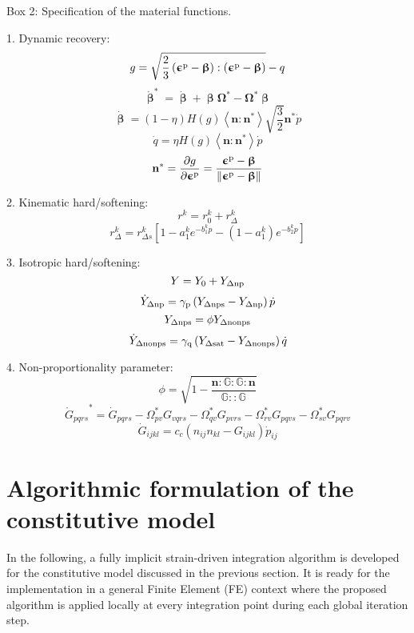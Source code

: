 \begin{framed}
\label{Box:1}
Box 2: Specification of the material functions.

1. Dynamic recovery:
\[g = \sqrt {\frac{2}{3}\left( {{{\bm{\upepsilon }}^{\rm{p}}} - {\bm{\upbeta}}} \right):\left( {{{\bm{\upepsilon }}^{\rm{p}}} - {\bm{\upbeta}}} \right)}  - q\]
\[{\mathring {\bm{\upbeta }}^{*}} = \dot {\bm{\upbeta }}  + \bm{\upbeta } {{\mathbf{\Omega }}^*} - {{\mathbf{\Omega }}^*}\bm{\upbeta }\]
\[\dot{\bm{\upbeta}}  = \left( {1 - \eta } \right)H\left( g \right)\left\langle {{\mathbf{n}}:{{\mathbf{n}}^*}} \right\rangle \sqrt {\frac{3}{2}} {{\mathbf{n}}^*}\dot p\]
\[\dot q = \eta H\left( g \right)\left\langle {{\mathbf{n}}:{{\mathbf{n}}^*}} \right\rangle \dot p\]
\[{{\mathbf{n}}^*} = \frac{{\partial g}}{{\partial {{\bm{\upepsilon }}^{\rm{p}}}}} = \frac{{{{\bm{\upepsilon }}^{\rm{p}}} - {\bm{\upbeta}}}}{{\left\| {{{\bm{\upepsilon }}^{\rm{p}}} - {\bm{\upbeta}}} \right\|}}\]


2. Kinematic hard/softening:
\[{r^k} = r_0^k + r_\Delta ^k\]
\[r_\Delta ^k = r_{\Delta s}^k\left[ {1 - a_1^k{e^{ - b_1^kp}} - (1-a_1^k){e^{ - b_2^kp}} }\right]\]


3. Isotropic hard/softening:
\[Y = {Y_0} + {Y_{\Delta \rm np}}\]
\[{\dot Y_{\Delta \rm np}} = {\gamma _{\rm p}}\left( {{Y_{\Delta \rm nps}} - {Y_{\Delta \rm np}}} \right)\dot p\]
\[{Y_{\Delta \rm nps}} = \phi {Y_{\Delta \rm nonps}}\]
\[{\dot Y_{\Delta \rm nonps}} = {\gamma _{\rm q}}\left( {{Y_{\Delta \rm sat}} - {Y_{\Delta \rm nonps}}} \right)\dot q\]


4. Non-proportionality parameter:
\[\phi  = \sqrt {1 - \frac{{{\mathbf{n}}:\mathbb{G}:\mathbb{G}:{\mathbf{n}}}}{{\mathbb{G}::\mathbb{G}}}} \]
\[{\mathring G _{pqrs}}^* = {{\dot G}_{pqrs}} - \Omega _{pv}^*{G_{vqrs}} - \Omega _{qv}^*{G_{pvrs}} - \Omega _{rv}^*{G_{pqvs}} - \Omega _{sv}^*{G_{pqrv}}\]
\[{{\dot G}_{ijkl}} = {c_c}\left( {{n_{ij}}{n_{kl}} - {G_{ijkl}}} \right){{\dot p}_{ij}}\]
\end{framed}

\section{Algorithmic formulation of the constitutive model}
\noindent
In the following, a fully implicit strain-driven integration algorithm is developed for the constitutive model discussed in the previous section. It is ready for the implementation in a general Finite Element (FE) context where the proposed algorithm is applied locally at every integration point during each global iteration step.

